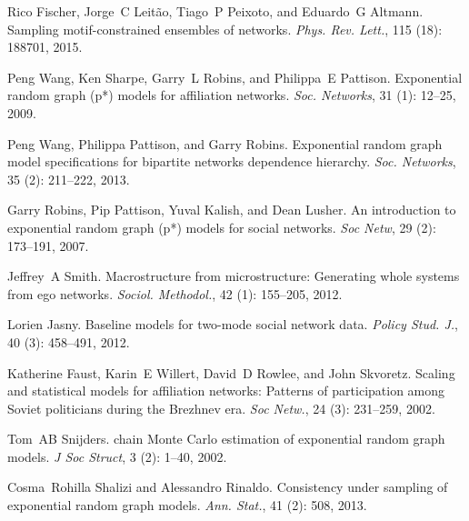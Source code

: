 Rico Fischer, Jorge~C Leit{\~a}o, Tiago~P Peixoto, and Eduardo~G Altmann.
\newblock Sampling motif-constrained ensembles of networks.
\newblock \emph{Phys. Rev. Lett.}, 115 (18): 188701, 2015.

Peng Wang, Ken Sharpe, Garry~L Robins, and Philippa~E Pattison.
\newblock Exponential random graph (p*) models for affiliation networks.
\newblock \emph{Soc. Networks}, 31 (1): 12--25, 2009.

Peng Wang, Philippa Pattison, and Garry Robins.
\newblock Exponential random graph model specifications for bipartite
networks dependence hierarchy.
\newblock \emph{Soc. Networks}, 35 (2): 211--222,
2013{}.

Garry Robins, Pip Pattison, Yuval Kalish, and Dean Lusher.
\newblock An introduction to exponential random graph (p*) models for social
networks.
\newblock \emph{Soc Netw}, 29 (2): 173--191, 2007.

Jeffrey~A Smith.
\newblock Macrostructure from microstructure: {{Generating}} whole systems from
ego networks.
\newblock \emph{Sociol. Methodol.}, 42 (1): 155--205, 2012.

Lorien Jasny.
\newblock Baseline models for two-mode social network data.
\newblock \emph{Policy Stud. J.}, 40 (3): 458--491, 2012.

Katherine Faust, Karin~E Willert, David~D Rowlee, and John Skvoretz.
\newblock Scaling and statistical models for affiliation networks: Patterns of
participation among {{Soviet}} politicians during the {{Brezhnev}} era.
\newblock \emph{Soc Netw.}, 24 (3): 231--259, 2002.

Tom~AB Snijders.
 chain {{Monte Carlo}} estimation of exponential random graph
models.
\newblock \emph{J Soc Struct}, 3 (2): 1--40, 2002.

Cosma~Rohilla Shalizi and Alessandro Rinaldo.
\newblock Consistency under sampling of exponential random graph models.
\newblock \emph{Ann. Stat.}, 41 (2): 508, 2013.

